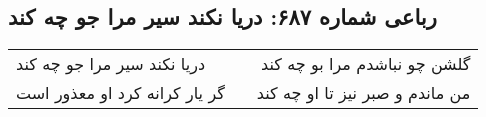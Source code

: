 \begin{center}
\section*{رباعی شماره ۶۸۷: دریا نکند سیر مرا جو چه کند}
\label{sec:0687}
\begin{longtable}{l p{0.5cm} r}
دریا نکند سیر مرا جو چه کند
&&
گلشن چو نباشدم مرا بو چه کند
\\
گر یار کرانه کرد او معذور است
&&
من ماندم و صبر نیز تا او چه کند
\\
\end{longtable}
\end{center}
